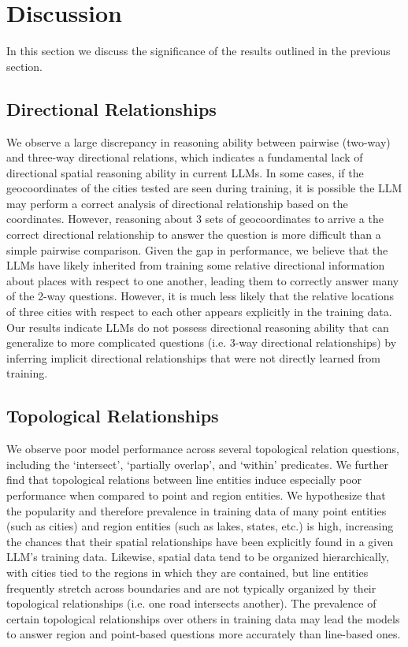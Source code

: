 \section{Discussion}
\label{section:discussion}

In this section we discuss the significance of the results outlined in the previous section.

\subsection{Directional Relationships}
We observe a large discrepancy in reasoning ability between pairwise (two-way) and three-way directional relations, which indicates a fundamental lack of directional spatial reasoning ability in current LLMs.
In some cases, if the geocoordinates of the cities tested are seen during training, it is possible the LLM may perform a correct analysis of directional relationship based on the coordinates.
However, reasoning about 3 sets of geocoordinates to arrive a the correct directional relationship to answer the question is more difficult than a simple pairwise comparison.
Given the gap in performance, we believe that the LLMs have likely inherited from training some relative directional information about places with respect to one another, leading them to correctly answer many of the 2-way questions.
However, it is much less likely that the relative locations of three cities with respect to each other appears explicitly in the training data.
Our results indicate LLMs do not possess directional reasoning ability that can generalize to more complicated questions (i.e. 3-way directional relationships) by inferring implicit directional relationships that were not directly learned from training.

\subsection{Topological Relationships}
We observe poor model performance across several topological relation questions, including the `intersect', `partially overlap', and `within' predicates.
We further find that topological relations between line entities induce especially poor performance when compared to point and region entities.
We hypothesize that the popularity and therefore prevalence in training data of many point entities (such as cities) and region entities (such as lakes, states, etc.) is high, increasing the chances that their spatial relationships have been explicitly found in a given LLM's training data.
Likewise, spatial data tend to be organized hierarchically, with cities tied to the regions in which they are contained, but line entities frequently stretch across boundaries and are not typically organized by their topological relationships (i.e. one road intersects another).
The prevalence of certain topological relationships over others in training data may lead the models to answer region and point-based questions more accurately than line-based ones.

